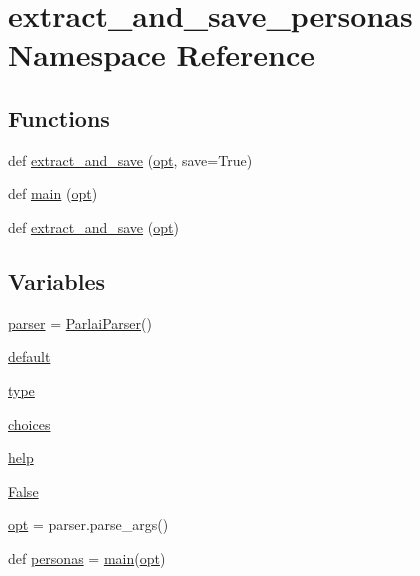 \hypertarget{namespaceextract__and__save__personas}{}\section{extract\+\_\+and\+\_\+save\+\_\+personas Namespace Reference}
\label{namespaceextract__and__save__personas}
\subsection*{Functions}
\begin{DoxyCompactItemize}
\item 
def \hyperlink{namespaceextract__and__save__personas_a8de429c2a432ebaa5185e44fe39a1f73}{extract\+\_\+and\+\_\+save} (\hyperlink{namespaceextract__and__save__personas_aff53e2793525b34ab0aff249a99f7614}{opt}, save=True)
\item 
def \hyperlink{namespaceextract__and__save__personas_abb9b78f74e9baf9fa763bff3c1b99381}{main} (\hyperlink{namespaceextract__and__save__personas_aff53e2793525b34ab0aff249a99f7614}{opt})
\item 
def \hyperlink{namespaceextract__and__save__personas_af6196a0605098280a6766f0f9a99e4b5}{extract\+\_\+and\+\_\+save} (\hyperlink{namespaceextract__and__save__personas_aff53e2793525b34ab0aff249a99f7614}{opt})
\end{DoxyCompactItemize}
\subsection*{Variables}
\begin{DoxyCompactItemize}
\item 
\hyperlink{namespaceextract__and__save__personas_ae07f40cdfaf4942445be7ad429f3f7c5}{parser} = \hyperlink{classparlai_1_1core_1_1params_1_1ParlaiParser}{Parlai\+Parser}()
\item 
\hyperlink{namespaceextract__and__save__personas_a475e9f30a72263f9f48fe2ba3aa9d8d4}{default}
\item 
\hyperlink{namespaceextract__and__save__personas_af116e2357189d9aa2affa8415c755753}{type}
\item 
\hyperlink{namespaceextract__and__save__personas_ae72c36d50a42709ff5063eafd8f893e3}{choices}
\item 
\hyperlink{namespaceextract__and__save__personas_a2595f9cc736ece41c99f419ac9a0d62c}{help}
\item 
\hyperlink{namespaceextract__and__save__personas_af35627fe45b8d65e20273bd55cb63f70}{False}
\item 
\hyperlink{namespaceextract__and__save__personas_aff53e2793525b34ab0aff249a99f7614}{opt} = parser.\+parse\+\_\+args()
\item 
def \hyperlink{namespaceextract__and__save__personas_a11c31165d1c524ef4bd4b4abd28a018e}{personas} = \hyperlink{namespaceextract__and__save__personas_abb9b78f74e9baf9fa763bff3c1b99381}{main}(\hyperlink{namespaceextract__and__save__personas_aff53e2793525b34ab0aff249a99f7614}{opt})
\end{DoxyCompactItemize}


